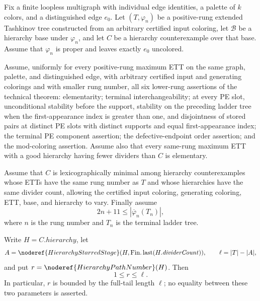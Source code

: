 \begin{lemma}
Fix a finite loopless multigraph with individual edge identities, a
palette of $k$ colors, and a distinguished edge $e_0$.  Let
$(T,\varphi_n)$ be a positive-rung extended Tashkinov tree constructed
from an arbitrary certified input coloring, let $\mathcal B$ be a
hierarchy base under $\varphi_n$, and let $C$ be a hierarchy
counterexample over that base.  Assume that $\varphi_n$ is proper and
leaves exactly $e_0$ uncolored.

Assume, uniformly for every positive-rung maximum ETT on the same graph,
palette, and distinguished edge, with arbitrary certified input and
generating colorings and with smaller rung number, all six lower-rung
assertions of the technical theorem: elementarity; terminal
interchangeability; at every PE slot, unconditional stability before the
support, stability on the preceding ladder tree when the first-appearance
index is greater than one, and disjointness of stored pairs at distinct PE
slots with distinct supports and equal first-appearance index; the terminal
PE component assertion; the defective-endpoint order assertion; and the
mod-coloring assertion.  Assume also that every
same-rung maximum ETT with a good hierarchy having fewer dividers than
$C$ is elementary.

Assume that $C$ is lexicographically minimal among hierarchy
counterexamples whose ETTs have the same rung number as $T$ and whose
hierarchies have the same divider count, allowing the certified input
coloring, generating coloring, ETT, base, and hierarchy to vary.  Finally
assume
\[
 2n+11\leq |\overline\varphi_n(T_n)|,
\]
where $n$ is the rung number and $T_n$ is the terminal ladder tree.

Write $H=C.\mathit{hierarchy}$, let
\[
 A=\noderef{HierarchyStarredStage}
      (H,\operatorname{Fin.last}(H.\mathit{dividerCount})),
 \qquad \ell=|T|-|A|,
\]
and put $r=\noderef{HierarchyPathNumber}(H)$.  Then
\[
                         1\leq r\leq \ell .
\]
In particular, $r$ is bounded by the full-tail length $\ell$; no
equality between these two parameters is asserted.
\end{lemma}

